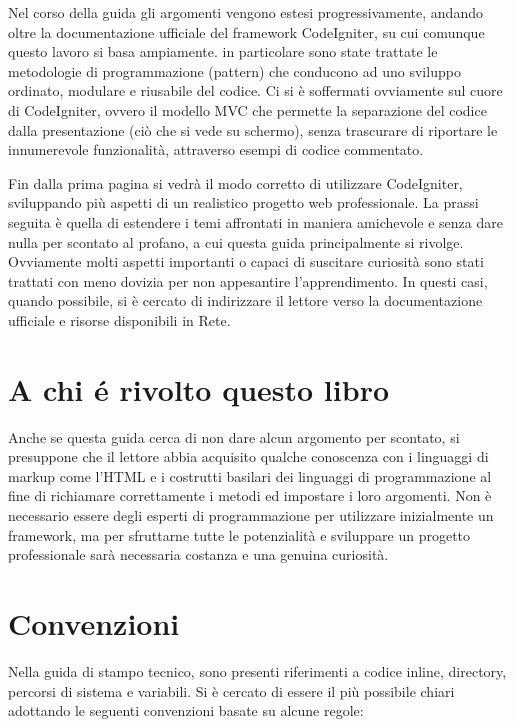 Nel corso della guida gli argomenti vengono estesi progressivamente, andando oltre la documentazione ufficiale del framework CodeIgniter, su cui comunque questo lavoro si basa ampiamente. in particolare sono state trattate le metodologie di programmazione (pattern) che conducono ad uno sviluppo ordinato, modulare e riusabile del codice. Ci si è soffermati ovviamente sul cuore di CodeIgniter, ovvero il modello \ac{MVC} che permette la separazione del codice dalla presentazione (ciò che si vede su schermo), senza trascurare di riportare le innumerevole funzionalità, attraverso esempi di codice commentato.

Fin dalla prima pagina si vedrà il modo corretto di utilizzare CodeIgniter, sviluppando più aspetti di un realistico progetto web professionale. La prassi seguita è quella di estendere i temi affrontati in maniera amichevole e senza dare nulla per scontato al profano, a cui questa guida principalmente si rivolge. Ovviamente molti aspetti importanti o capaci di suscitare curiosità sono stati trattati con meno dovizia per non appesantire l'apprendimento. In questi casi, quando possibile, si è cercato di indirizzare il lettore verso la documentazione ufficiale e risorse disponibili in Rete.

\section*{A chi \'e rivolto questo libro}
Anche se questa guida cerca di non dare alcun argomento per scontato, si presuppone che il lettore abbia acquisito qualche conoscenza con i linguaggi di markup come l'\ac{HTML} e i costrutti basilari dei linguaggi di programmazione al fine di richiamare correttamente i metodi ed impostare i loro argomenti. Non è necessario essere degli esperti di programmazione per utilizzare inizialmente un framework, ma per  sfruttarne tutte le potenzialità e sviluppare un progetto professionale sarà necessaria costanza e una genuina curiosità.

\section*{Convenzioni}
Nella guida di stampo tecnico, sono presenti riferimenti a codice inline, directory, percorsi di sistema e variabili. Si è cercato di essere il più possibile chiari adottando le seguenti convenzioni basate su alcune regole:

